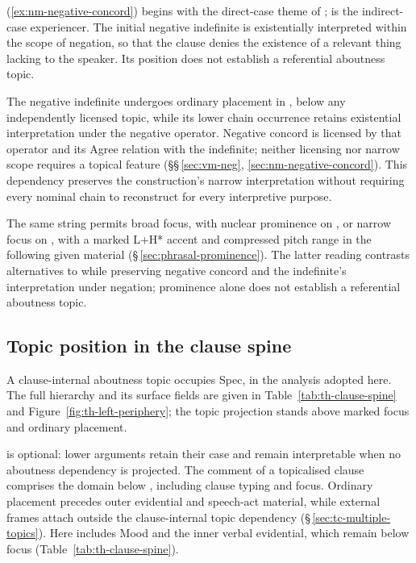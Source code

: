  
 (\ref{ex:nm-negative-concord}) begins with the direct-case theme of
  ;  is the indirect-case experiencer.
 The initial negative indefinite is existentially interpreted within the scope
 of negation, so that the clause denies the existence of a relevant thing
 lacking to the speaker. Its position does not establish a referential
 aboutness topic.

The negative indefinite undergoes ordinary placement in ,
 below any independently licensed topic, while its lower chain occurrence
 retains existential interpretation under the negative operator. Negative
 concord is licensed by that operator and its Agree relation with the
 indefinite; neither licensing nor narrow scope requires a topical feature
 (§§\,\ref{sec:vm-neg}, \ref{sec:nm-negative-concord}). This dependency
 preserves the construction's narrow interpretation without requiring every
 nominal chain to reconstruct for every interpretive purpose.

The same string permits broad focus, with nuclear prominence on
 , or narrow focus on , with a marked L+H* accent
 and compressed pitch range in the following given material
 (§\,\ref{sec:phrasal-prominence}). The latter reading contrasts
 alternatives to  while preserving negative concord and
 the indefinite's interpretation under negation; prominence alone does
 not establish a referential aboutness topic.

\subsection{Topic position in the clause spine}
\label{sec:tc-clause-spine}\label{sec:th-left-periphery}

A clause-internal aboutness topic occupies Spec, in the
 analysis adopted here. The full hierarchy and its surface fields are given in
Table~\ref{tab:th-clause-spine} and Figure~\ref{fig:th-left-periphery};
the topic projection stands above marked focus and ordinary placement.

\noindent {} is optional: lower arguments retain their case and
 remain interpretable when no aboutness dependency is projected. The comment
 of a topicalised clause comprises the domain below , including
 clause typing and focus. Ordinary placement precedes outer evidential and speech-act material,
 while external frames attach outside the clause-internal topic
 dependency (§\,\ref{sec:tc-multiple-topics}). Here  includes
 Mood and the inner verbal evidential, which remain below focus
 (Table~\ref{tab:th-clause-spine}).


